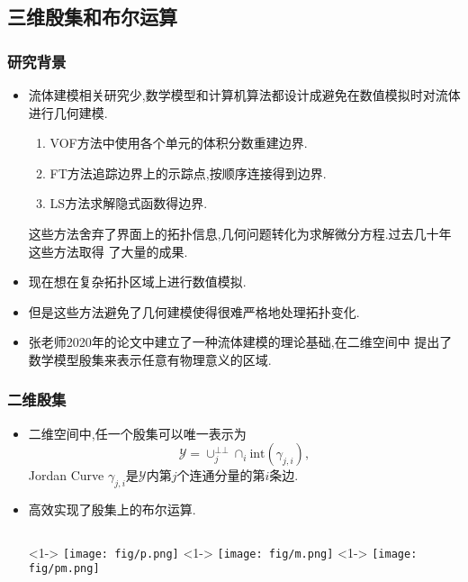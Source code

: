 \documentclass[UTF8]{ctexbeamer}	%
\theoremstyle{plain}
\theoremstyle{definition}
\theoremstyle{remark}
\numberwithin{equation}{section}
\begin{document}
\subsection{三维殷集和布尔运算}
\begin{frame}
    \frametitle{研究背景}
    \begin{itemize}
        \item 流体建模相关研究少,数学模型和计算机算法都设计成避免在数值模拟时对流体
        进行几何建模.
        \begin{enumerate}
            \item VOF方法中使用各个单元的体积分数重建边界.
            \item FT方法追踪边界上的示踪点,按顺序连接得到边界.
            \item LS方法求解隐式函数得边界.
        \end{enumerate}
        这些方法舍弃了界面上的拓扑信息,几何问题转化为求解微分方程.过去几十年这些方法取得
        了大量的成果.
        \item 现在想在复杂拓扑区域上进行数值模拟.
        \item 但是这些方法避免了几何建模使得很难严格地处理拓扑变化.
        \item 张老师2020年的论文中建立了一种流体建模的理论基础,在二维空间中
        提出了数学模型殷集来表示任意有物理意义的区域.
    \end{itemize}
\end{frame}

\begin{frame}
    \frametitle{二维殷集}
    \begin{itemize}
        \item 二维空间中,任一个殷集可以唯一表示为
        \[\mathcal{Y} = \cup_j^{\bot \bot}\cap_i \text{int}(\gamma_{j, i} ),\]
        Jordan Curve $\gamma_{j, i}$是$\mathcal{Y}$内第$j$个连通分量的第$i$条边.
        \item 高效实现了殷集上的布尔运算. 
        \begin{columns}
            <1->
                \texttt{[image: fig/p.png]}
            <1->
            \texttt{[image: fig/m.png]}
            <1->
            \texttt{[image: fig/pm.png]}
        \end{columns}
    \end{itemize}
\end{frame}
\end{document}
